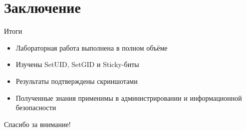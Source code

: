 \documentclass[
  ignorenonframetext,
  aspectratio=169,
  russian,
]{beamer}
\providecommand{\tightlist}{%
  \setlength{\itemsep}{0pt}\setlength{\parskip}{0pt}}
\begin{document}
\section{Заключение}\label{ux437ux430ux43aux43bux44eux447ux435ux43dux438ux435}

\begin{frame}{Итоги}
\label{ux438ux442ux43eux433ux438}
\begin{itemize}[<+->]
\tightlist
\item
  Лабораторная работа выполнена в полном объёме
\item
  Изучены SetUID, SetGID и Sticky-биты
\item
  Результаты подтверждены скриншотами
\item
  Полученные знания применимы в администрировании и информационной
  безопасности
\end{itemize}
\end{frame}

\begin{frame}{Спасибо за внимание!}
\label{ux441ux43fux430ux441ux438ux431ux43e-ux437ux430-ux432ux43dux438ux43cux430ux43dux438ux435}
\end{frame}
\end{document}
